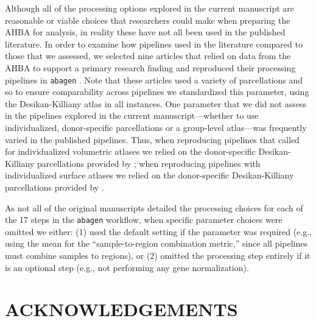 \documentclass[12pt,aps,pra,reprint,showkeys]{revtex4-1}
\begin{document}
Although all of the processing options explored in the current manuscript are reasonable or viable choices that researchers could make when preparing the AHBA for analysis, in reality these have not all been used in the published literature.
In order to examine how pipelines used in the literature compared to those that we assessed, we selected nine articles that relied on data from the AHBA to support a primary research finding and reproduced their processing pipelines in \texttt{abagen} \citep{hawrylycz2015natneuro, french2015frontneurosci, whitakervertes2016pnas, krienen2016pnas, anderson2018natcomm, burt2018natneuro, romerogarcia2018neuroimage, anderson2020pnas, liu2020neuroimage}.
Note that these articles used a variety of parcellations and so to ensure comparability across pipelines we standardized this parameter, using the Desikan-Killiany atlas in all instances.
One parameter that we did not assess in the pipelines explored in the current manuscript---whether to use individualized, donor-specific parcellations or a group-level atlas---was frequently varied in the published pipelines.
Thus, when reproducing pipelines that called for individualized volumetric atlases we relied on the donor-specific Desikan-Killiany parcellations provided by \citet{arnatkeviciute2019neuroimage}; when reproducing pipelines with individualized surface atlases we relied on the donor-specific Desikan-Killiany parcellations provided by \citet{romerogarcia2018neuroimage}.

As not all of the original manuscripts detailed the processing choices for each of the 17 steps in the \texttt{abagen} workflow, when specific parameter choices were omitted we either: (1) used the default setting if the parameter was required (e.g., using the mean for the ``sample-to-region combination metric,'' since all pipelines must combine samples to regions), or (2) omitted the processing step entirely if it is an optional step (e.g., not performing any gene normalization).

\section*{ACKNOWLEDGEMENTS}
\end{document}
